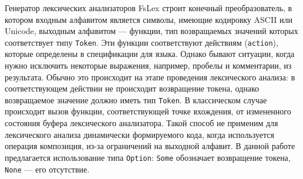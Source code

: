 \documentclass[10pt, conference, compsocconf]{IEEEtran}
\begin{document}
Генератор лексических анализаторов FsLex строит конечный преобразователь, в котором входным алфавитом является символы, имеющие кодировку ASCII или Unicode, выходным алфавитом --- функции, тип возвращаемых значений которых соответствует типу \verb|Token|. Эти функции соответствуют действиям (\verb|action|), которые определены в спецификации для языка.  Однако бывают ситуации, когда нужно исключить некоторые выражения, например, пробелы и комментарии, из результата. Обычно это происходит на этапе проведения лексического анализа: в соответствующем действии не происходит возвращение токена, однако возвращаемое значение должно иметь тип \verb|Token|.  В классическом случае происходит вызов функции, соответствующей точке вхождения, от измененного состояния буфера лексического анализатора. Такой способ не применим для лексического анализа динамически формируемого кода, когда используется операция композиция, из-за ограничений на выходной алфавит. В данной работе предлагается использование типа \verb|Option|: \verb|Some| обозначает возвращение токена, \verb|None| --- его отсутствие. 
\end{document}
